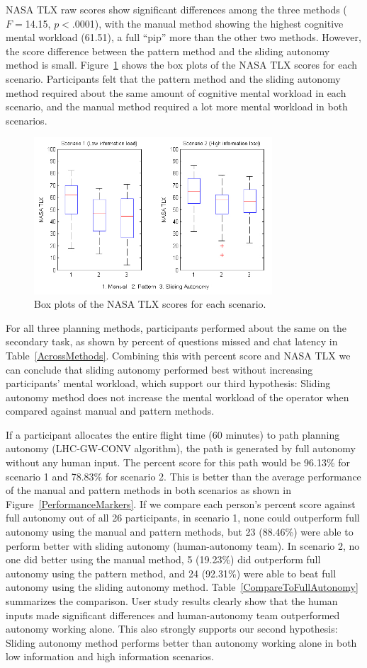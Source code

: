 \documentclass[lettersize, apacite, twoside, HRI]{apa_HRI}
\begin{document}
NASA TLX raw scores show significant differences among the three methods ($F=$14.15, $p<$.0001), with the manual method showing the highest cognitive mental workload (61.51), a full ``pip'' more than the other two methods. However, the score difference between the pattern method and the sliding autonomy method is small. Figure~\ref{NASATLX} shows the box plots of the NASA TLX scores for each scenario. Participants felt that the pattern method and the sliding autonomy method required about the same amount of cognitive mental workload in each scenario, and the manual method required a lot more mental workload in both scenarios.

\begin{figure}
\centering
\includegraphics[width=3.5in]{NASATLXBoxPlot.JPG}
\caption{Box plots of the NASA TLX scores for each scenario.}
\label{NASATLX}
\end{figure}

For all three planning methods, participants performed about the same on the secondary task, as shown by percent of questions missed and chat latency in Table~\ref{AcrossMethods}. Combining this with percent score and NASA TLX we can conclude that sliding autonomy performed best without increasing participants' mental workload, which support our third hypothesis: Sliding autonomy method does not increase the mental workload of the operator when compared against manual and pattern methods.

If a participant allocates the entire flight time (60 minutes) to path planning autonomy (LHC-GW-CONV algorithm), the path is generated by full autonomy without any human input. The percent score for this path would be 96.13\% for scenario 1 and 78.83\% for scenario 2. This is better than the average performance of the manual and pattern methods in both scenarios as shown in Figure~\ref{PerformanceMarkers}. If we compare each person's percent score against full autonomy out of all 26 participants, in scenario 1, none could outperform full autonomy using the manual and pattern methods, but 23 (88.46\%) were able to perform better with sliding autonomy (human-autonomy team). In scenario 2, no one did better using the manual method, 5 (19.23\%) did outperform full autonomy using the pattern method, and 24 (92.31\%) were able to beat full autonomy using the sliding autonomy method. Table~\ref{CompareToFullAutonomy} summarizes the comparison. User study results clearly show that the human inputs made significant differences and human-autonomy team outperformed autonomy working alone. This also strongly supports our second hypothesis: Sliding autonomy method performs better than autonomy working alone in both low information and high information scenarios.
\end{document}
